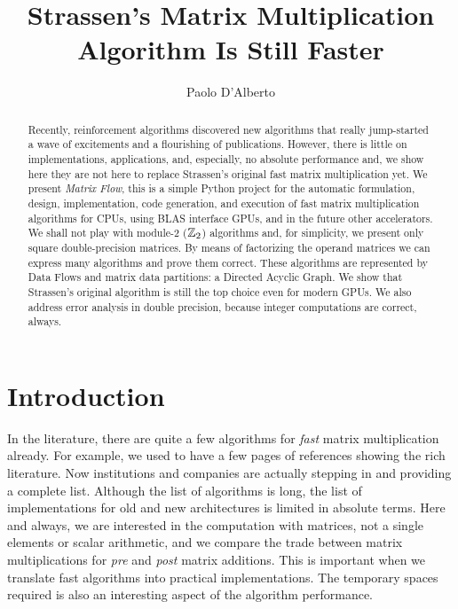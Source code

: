\documentclass[acmsmall]{acmart}
\begin{document}
\title{Strassen's Matrix Multiplication Algorithm Is Still Faster}

\author{Paolo D'Alberto}
\email{}

\renewcommand{\shortauthors}{D'Alberto et al.}

\begin{abstract}
  Recently, reinforcement algorithms discovered new algorithms that
  really jump-started a wave of excitements and a flourishing of
  publications. However, there is little on implementations,
  applications, and, especially, no absolute performance and, we show
  here they are not here to replace Strassen's original fast matrix
  multiplication yet.  We present {\em Matrix Flow}, this is a simple
  Python project for the automatic formulation, design,
  implementation, code generation, and execution of fast matrix
  multiplication algorithms for CPUs, using BLAS interface GPUs, and
  in the future other accelerators. We shall not play with module-2
  ($\mathbb{Z}_2$) algorithms and, for simplicity, we present only square
  double-precision matrices. By means of factorizing the operand
  matrices we can express many algorithms and prove them
  correct. These algorithms are represented by Data Flows and matrix
  data partitions: a Directed Acyclic Graph. We show that Strassen's
  original algorithm is still the top choice even for modern GPUs. We
  also address error analysis in double precision, because integer
  computations are correct, always.
\end{abstract}

\maketitle

\section{Introduction} 
\label{sec:introduction}
In the literature, there are quite a few algorithms for {\em fast}
matrix multiplication already. For example, we used to have a few
pages of references showing the rich literature. Now institutions and
companies are actually stepping in and providing a complete
list. Although the list of algorithms is long, the list of
implementations for old and new architectures is limited in absolute
terms. Here and always, we are interested in the computation with
matrices, not a single elements or scalar arithmetic, and we compare
the trade between matrix multiplications for {\em pre} and {\em post}
matrix additions.  This is important when we translate fast algorithms
into practical implementations. The temporary spaces required is also
an interesting aspect of the algorithm performance.
\end{document}
